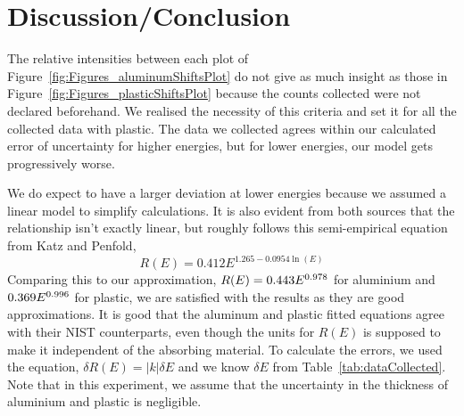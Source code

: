 


\section{Discussion/Conclusion}

\label{sec:discussion_conclusion} The relative intensities between each plot of Figure~\ref{fig:Figures_aluminumShiftsPlot} do not give as much insight as those in Figure~\ref{fig:Figures_plasticShiftsPlot} because the counts collected were not declared beforehand. We realised the necessity of this criteria and set it for all the collected data with plastic. The data we collected agrees within our calculated error of uncertainty for higher energies, but for lower energies, our model gets progressively worse. 

We do expect to have a larger deviation at lower energies because we assumed a linear model to simplify calculations. It is also evident from both sources that the relationship isn't exactly linear, but roughly follows this semi-empirical equation from Katz and Penfold,\cite{RevModPhys.24.28} 
\begin{equation}
	R(E) = 0.412 E^{1.265 - 0.0954 \ln(E)} 
	\label{eq:acceptedEq} 
\end{equation} %
Comparing this to our approximation, $R(E) = 0.443 E^{0.978}$ for aluminium and $0.369 E^{0.996}$ for plastic, we are satisfied with the results as they are good approximations.  It is good that the aluminum and plastic fitted equations agree with their NIST counterparts, even though the units for $R(E)$ is supposed to make it independent of the absorbing material. To calculate the errors, we used the equation,\cite{093570275X} $\delta R(E) = |k| \delta E$ and we know $\delta E$ from Table~\ref{tab:dataCollected}. Note that in this experiment, we assume that the uncertainty in the thickness of aluminium and plastic is negligible. 

